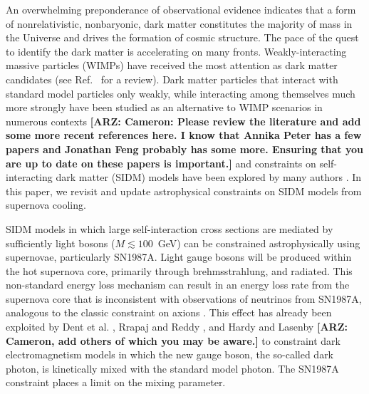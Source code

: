 \documentclass[nofootinbib,prd,superscriptaddress,twocolumn]{revtex4}
\newcommand{\arz}[1]{{{\bf{\color{BrickRed}[ARZ: #1]}}}}
\begin{document}
An overwhelming preponderance of observational evidence indicates that a form of nonrelativistic, nonbaryonic, 
dark matter constitutes the majority of mass in the Universe and drives the formation of cosmic structure. 
The pace of the quest to identify the dark matter is accelerating on many fronts. Weakly-interacting massive 
particles (WIMPs) have received the most attention as dark matter candidates (see Ref.~\cite{jungman_etal96} for a review). 
Dark matter particles that interact with standard model particles only weakly, while interacting among themselves 
much more strongly have been studied as an alternative to WIMP scenarios in numerous contexts 
\cite{carlson_etal92,deLaix_etal95,atrio-barandela_davidson97,spergel_steinhardt00,hogan_dalcanton00,mohapatra_teplitz00,
dave_etal01,hisano_etal04,hisano_etal05,pospelov_etal08,arkani-hamed_etal08a,lattanzi_silk08,ackerman_etal09,feng_etal09,
kong_etal15} \arz{Cameron: Please review the literature and add some more recent references here. 
I know that Annika Peter has a few papers and Jonathan Feng probably has some more. 
Ensuring that you are up to date on these papers is important.} 
and constraints on self-interacting dark matter (SIDM) models have been explored by many authors \cite{yoshida_etal00,gnedin_ostriker01,miralda-escude02,randall_etal08,kamionkowski_profumo08,zentner09,robertson_zentner09,pieri_etal09,spolyar_etal09,finkbeiner_etal09,
slatyer_etal09,bramante_etal14,albuquerque_etal14,kaplinghat_etal14,chen_etal14,feng_etal16,catena_widmark16}. 
In this paper, we revisit and update astrophysical constraints on SIDM models from 
supernova cooling.


SIDM models in which large self-interaction cross sections are mediated by sufficiently light 
bosons ($M \lesssim 100$~GeV) can be constrained astrophysically using supernovae, particularly 
SN1987A. Light gauge bosons will be produced within the hot supernova core, primarily through 
brehmsstrahlung, and radiated. This non-standard energy loss mechanism can result in an energy loss rate 
from the supernova core that is inconsistent with observations of neutrinos from SN1987A, 
analogous to the classic constraint on axions \cite{turner88,raffelt96_book}. 
This effect has already been exploited by Dent et al. \cite{dent_etal12}, Rrapaj and Reddy \cite{rrapaj_reddy16}, and 
Hardy and Lasenby \cite{hardy_lasenby17} \arz{Cameron, add others of which you may be aware.}
to constraint dark electromagnetism models in which the new gauge boson, the so-called dark photon, 
is kinetically mixed with the standard model photon. The SN1987A constraint places a limit on the mixing parameter. 
\end{document}
